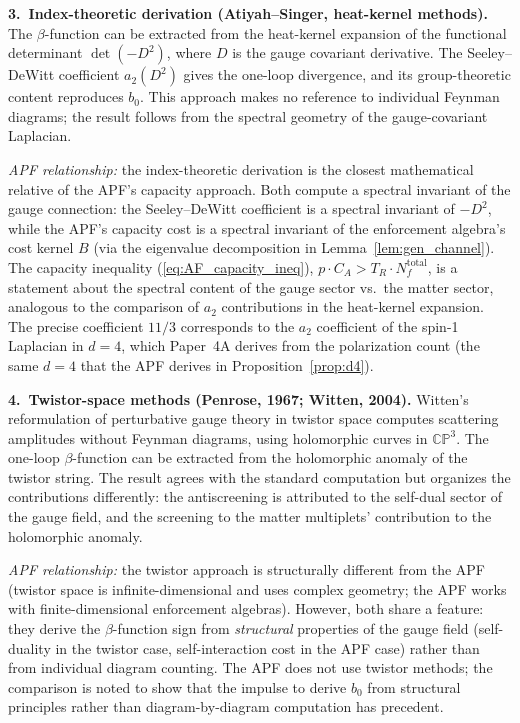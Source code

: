 \documentclass[11pt,a4paper]{article}
\theoremstyle{definition}
\begin{document}
\smallskip\noindent\textbf{3.\ Index-theoretic derivation
(Atiyah--Singer, heat-kernel methods).}\quad
The $\beta$-function can be extracted from the heat-kernel expansion
of the functional determinant $\det(-D^2)$, where $D$ is the gauge
covariant derivative.  The Seeley--DeWitt coefficient $a_2(D^2)$
gives the one-loop divergence, and its group-theoretic content
reproduces $b_0$.  This approach makes no reference to individual
Feynman diagrams; the result follows from the spectral geometry of
the gauge-covariant Laplacian.

\textit{APF relationship:} the index-theoretic derivation is the
closest mathematical relative of the APF's capacity approach.  Both
compute a spectral invariant of the gauge connection: the
Seeley--DeWitt coefficient is a spectral invariant of $-D^2$, while
the APF's capacity cost is a spectral invariant of the enforcement
algebra's cost kernel $B$ (via the eigenvalue decomposition in
Lemma~\ref{lem:gen_channel}).  The capacity inequality
(\ref{eq:AF_capacity_ineq}), $p \cdot C_A > T_R \cdot N_f^{\mathrm{total}}$,
is a statement about the spectral content of the gauge sector
vs.\ the matter sector, analogous to the comparison of
$a_2$ contributions in the heat-kernel expansion.  The precise
coefficient $11/3$ corresponds to the $a_2$ coefficient of the
spin-1 Laplacian in $d = 4$, which Paper~4A derives from
the polarization count (the same $d = 4$ that the APF derives in
Proposition~\ref{prop:d4}).

\smallskip\noindent\textbf{4.\ Twistor-space methods
(Penrose, 1967; Witten, 2004).}\quad
Witten's reformulation of perturbative gauge theory in twistor space
computes scattering amplitudes without Feynman diagrams, using
holomorphic curves in $\mathbb{CP}^3$.  The one-loop $\beta$-function
can be extracted from the holomorphic anomaly of the twistor string.
The result agrees with the standard computation but organizes the
contributions differently: the antiscreening is attributed to the
self-dual sector of the gauge field, and the screening to the
matter multiplets' contribution to the holomorphic anomaly.

\textit{APF relationship:} the twistor approach is structurally
different from the APF (twistor space is infinite-dimensional and
uses complex geometry; the APF works with finite-dimensional
enforcement algebras).  However, both share a feature: they derive
the $\beta$-function sign from \emph{structural} properties of the
gauge field (self-duality in the twistor case, self-interaction cost
in the APF case) rather than from individual diagram counting.  The
APF does not use twistor methods; the comparison is noted to show
that the impulse to derive $b_0$ from structural principles rather
than diagram-by-diagram computation has precedent.
\end{document}
